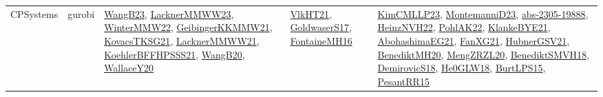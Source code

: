 {\begin{longtable}{llp{6cm}p{6cm}p{6cm}}
CPSystems & gurobi & \href{papers/WangB23.pdf}{WangB23}\cite{WangB23}, \href{articles/LacknerMMWW23.pdf}{LacknerMMWW23}\cite{LacknerMMWW23}, \href{papers/WinterMMW22.pdf}{WinterMMW22}\cite{WinterMMW22}, \href{papers/GeibingerKKMMW21.pdf}{GeibingerKKMMW21}\cite{GeibingerKKMMW21}, \href{papers/KovacsTKSG21.pdf}{KovacsTKSG21}\cite{KovacsTKSG21}, \href{papers/LacknerMMWW21.pdf}{LacknerMMWW21}\cite{LacknerMMWW21}, \href{articles/KoehlerBFFHPSSS21.pdf}{KoehlerBFFHPSSS21}\cite{KoehlerBFFHPSSS21}, \href{papers/WangB20.pdf}{WangB20}\cite{WangB20}, \href{articles/WallaceY20.pdf}{WallaceY20}\cite{WallaceY20} & \href{articles/VlkHT21.pdf}{VlkHT21}\cite{VlkHT21}, \href{papers/GoldwaserS17.pdf}{GoldwaserS17}\cite{GoldwaserS17}, \href{papers/FontaineMH16.pdf}{FontaineMH16}\cite{FontaineMH16} & \href{papers/KimCMLLP23.pdf}{KimCMLLP23}\cite{KimCMLLP23}, \href{articles/MontemanniD23.pdf}{MontemanniD23}\cite{MontemanniD23}, \href{articles/abs-2305-19888.pdf}{abs-2305-19888}\cite{abs-2305-19888}, \href{articles/HeinzNVH22.pdf}{HeinzNVH22}\cite{HeinzNVH22}, \href{articles/PohlAK22.pdf}{PohlAK22}\cite{PohlAK22}, \href{papers/KlankeBYE21.pdf}{KlankeBYE21}\cite{KlankeBYE21}, \href{articles/AbohashimaEG21.pdf}{AbohashimaEG21}\cite{AbohashimaEG21}, \href{articles/FanXG21.pdf}{FanXG21}\cite{FanXG21}, \href{articles/HubnerGSV21.pdf}{HubnerGSV21}\cite{HubnerGSV21}, \href{articles/BenediktMH20.pdf}{BenediktMH20}\cite{BenediktMH20}, \href{articles/MengZRZL20.pdf}{MengZRZL20}\cite{MengZRZL20}, \href{papers/BenediktSMVH18.pdf}{BenediktSMVH18}\cite{BenediktSMVH18}, \href{papers/DemirovicS18.pdf}{DemirovicS18}\cite{DemirovicS18}, \href{papers/He0GLW18.pdf}{He0GLW18}\cite{He0GLW18}, \href{papers/BurtLPS15.pdf}{BurtLPS15}\cite{BurtLPS15}, \href{papers/PesantRR15.pdf}{PesantRR15}\cite{PesantRR15}\\

\end{longtable}}
